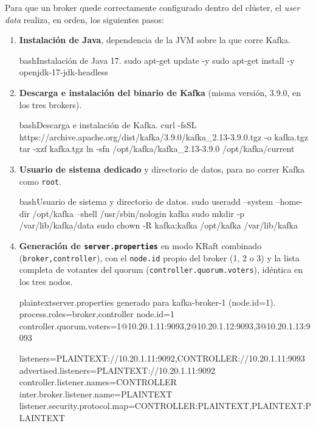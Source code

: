 		Para que un broker quede correctamente configurado dentro del clúster, el \textit{user data} realiza, en orden, los siguientes pasos:

		\begin{enumerate}
			\item \textbf{Instalación de Java}, dependencia de la JVM sobre la que corre Kafka.

			\begin{sourcecode}[\label{codigo-install-java}]{bash}{Instalación de Java 17.}
sudo apt-get update -y
sudo apt-get install -y openjdk-17-jdk-headless
			\end{sourcecode}

			\item \textbf{Descarga e instalación del binario de Kafka} (misma versión, 3.9.0, en los tres brokers).

			\begin{sourcecode}[\label{codigo-install-kafka}]{bash}{Descarga e instalación de Kafka.}
curl -fsSL https://archive.apache.org/dist/kafka/3.9.0/kafka_2.13-3.9.0.tgz -o kafka.tgz
tar -xzf kafka.tgz
ln -sfn /opt/kafka/kafka_2.13-3.9.0 /opt/kafka/current
			\end{sourcecode}

			\item \textbf{Usuario de sistema dedicado} y directorio de datos, para no correr Kafka como \texttt{root}.

			\begin{sourcecode}[\label{codigo-kafka-user}]{bash}{Usuario de sistema y directorio de datos.}
sudo useradd --system --home-dir /opt/kafka --shell /usr/sbin/nologin kafka
sudo mkdir -p /var/lib/kafka/data
sudo chown -R kafka:kafka /opt/kafka /var/lib/kafka
			\end{sourcecode}

			\item \textbf{Generación de \texttt{server.properties}} en modo KRaft combinado (\texttt{broker,controller}), con el \texttt{node.id} propio del broker (1, 2 o 3) y la lista completa de votantes del quorum (\texttt{controller.quorum.voters}), idéntica en los tres nodos.

			\begin{sourcecode}[\label{codigo-server-properties}]{plaintext}{server.properties generado para kafka-broker-1 (node.id=1).}
process.roles=broker,controller
node.id=1
controller.quorum.voters=1@10.20.1.11:9093,2@10.20.1.12:9093,3@10.20.1.13:9093

listeners=PLAINTEXT://10.20.1.11:9092,CONTROLLER://10.20.1.11:9093
advertised.listeners=PLAINTEXT://10.20.1.11:9092
controller.listener.names=CONTROLLER
inter.broker.listener.name=PLAINTEXT
listener.security.protocol.map=CONTROLLER:PLAINTEXT,PLAINTEXT:PLAINTEXT


\end{sourcecode}
\end{enumerate}
